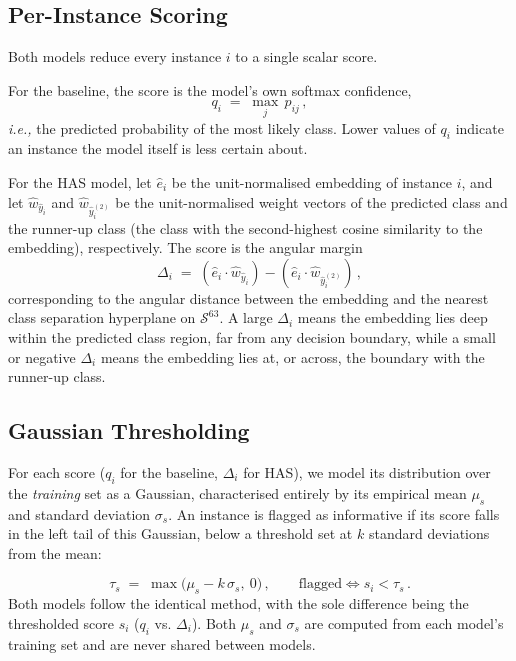 \subsection{Per-Instance Scoring}
\label{sec:scoring}


Both models reduce every instance $i$ to a single scalar score.

For the baseline, the score is the model's own softmax confidence,
\begin{equation}
  q_i \;=\; \max_j\, p_{ij}\,,
  \label{eq:conf}
\end{equation}
\textit{i.e.,} the predicted probability of the most likely class. Lower values
of $q_i$ indicate an instance the model itself is less certain about.

For the HAS model, let $\hat{e}_i$ be the unit-normalised embedding of
instance $i$, and let $\hat{w}_{\hat{y}_i}$ and $\hat{w}_{\hat{y}_i^{(2)}}$
be the unit-normalised weight vectors of the predicted class and the
runner-up class (the class with the second-highest cosine similarity to
the embedding), respectively. The score is the angular margin
\begin{equation}
  \Delta_i \;=\; (\hat{e}_i \cdot \hat{w}_{\hat{y}_i}) -
                 (\hat{e}_i \cdot \hat{w}_{\hat{y}_i^{(2)}}) \,,
  \label{eq:margin}
\end{equation}
corresponding to the angular distance between the embedding and the
nearest class separation hyperplane on $\mathcal{S}^{63}$. A large
$\Delta_i$ means the embedding lies deep within the predicted class
region, far from any decision boundary, while a small or negative $\Delta_i$
means the embedding lies at, or across, the boundary with the runner-up
class.

\subsection{Gaussian Thresholding}
\label{sec:gaussian}

For each score ($q_i$ for the baseline, $\Delta_i$ for HAS), we model its
distribution over the \emph{training} set as a Gaussian, characterised
entirely by its empirical mean $\mu_s$ and standard deviation $\sigma_s$.
An instance is flagged as informative if its score falls in the left tail
of this Gaussian, below a threshold set at $k$ standard deviations from
the mean:

\begin{equation}
  \tau_s \;=\; \max\!\bigl(\mu_s - k\,\sigma_s,\ 0\bigr)\,,
  \qquad
  \text{flagged} \iff s_i < \tau_s \,.
  \label{eq:thresh}
\end{equation}
Both models follow the identical method, with the sole difference being the 
thresholded score $s_i$ ($q_i$ vs. $\Delta_i$). Both $\mu_s$ and $\sigma_s$ 
are computed from each model's training set and are never shared between models. 


